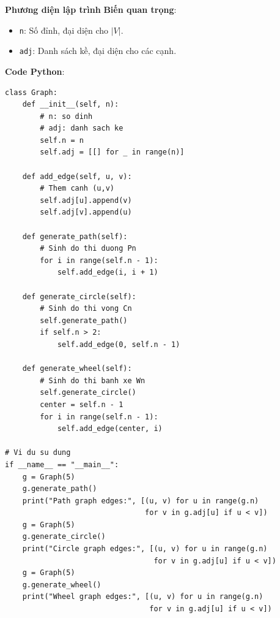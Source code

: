\documentclass[a4paper,12pt]{article}
\begin{document}
\textbf{Phương diện lập trình}
\textbf{Biến quan trọng}:
\begin{itemize}
    \item \texttt{n}: Số đỉnh, đại diện cho \( |V| \).
    \item \texttt{adj}: Danh sách kề, đại diện cho các cạnh.
\end{itemize}

\textbf{Code Python}:
\lstset{language=Python}
\begin{lstlisting}
class Graph:
    def __init__(self, n):
        # n: so dinh
        # adj: danh sach ke
        self.n = n
        self.adj = [[] for _ in range(n)]

    def add_edge(self, u, v):
        # Them canh (u,v)
        self.adj[u].append(v)
        self.adj[v].append(u)

    def generate_path(self):
        # Sinh do thi duong Pn
        for i in range(self.n - 1):
            self.add_edge(i, i + 1)

    def generate_circle(self):
        # Sinh do thi vong Cn
        self.generate_path()
        if self.n > 2:
            self.add_edge(0, self.n - 1)

    def generate_wheel(self):
        # Sinh do thi banh xe Wn
        self.generate_circle()
        center = self.n - 1
        for i in range(self.n - 1):
            self.add_edge(center, i)

# Vi du su dung
if __name__ == "__main__":
    g = Graph(5)
    g.generate_path()
    print("Path graph edges:", [(u, v) for u in range(g.n)
                                for v in g.adj[u] if u < v])
    g = Graph(5)
    g.generate_circle()
    print("Circle graph edges:", [(u, v) for u in range(g.n)
                                  for v in g.adj[u] if u < v])
    g = Graph(5)
    g.generate_wheel()
    print("Wheel graph edges:", [(u, v) for u in range(g.n)
                                 for v in g.adj[u] if u < v])
\end{lstlisting}
\end{document}

